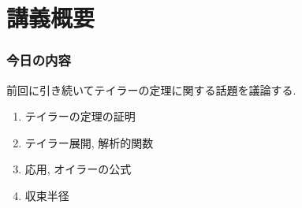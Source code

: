 
\section{講義概要}


\begin{frame}
\frametitle{今日の内容}


前回に引き続いてテイラーの定理に関する話題を議論する. 
\begin{enumerate}
\item テイラーの定理の証明
\item テイラー展開, 解析的関数
\item 応用, オイラーの公式
\item 収束半径
\end{enumerate} 



\end{frame}


